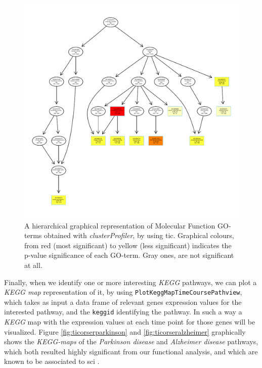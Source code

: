 \begin{figure}[H]
\centering
\includegraphics[width=\textwidth, keepaspectratio]{img/ticorser/functional/mf_hier.pdf}
\caption[ticorser hierarchial GO-terms]{A hierarchical graphical representation of Molecular Function GO-terms obtained with \textit{clusterProfiler}, by using \gls{tic}.
Graphical colours, from red (most significant) to yellow (less significant) indicates the p-value significance of each GO-term. 
Gray ones, are not significant at all.}
\label{fig:ticorsergo}
\end{figure}

Finally, when we identify one or more interesting \textit{KEGG} pathways, we can plot a \textit{KEGG map} representation of it, by using \lstinline!PlotKeggMapTimeCoursePathview!, which takes as input a data frame of relevant genes expression values for the interested pathway, and the \lstinline!keggid! identifying the pathway. 
In such a way a \textit{KEGG} map with the expression values at each time point for those genes will be visualized.
Figure \ref{fig:ticorserparkinson} and \ref{fig:ticorseralzheimer} graphically shows the \textit{KEGG-maps} of the \textit{Parkinson disease} and \textit{Alzheimer disease} pathways, which both resulted highly significant from our functional analysis, and which are known to be associated to \gls{sci} \cite{Yeh2016, Yeh2018}.

